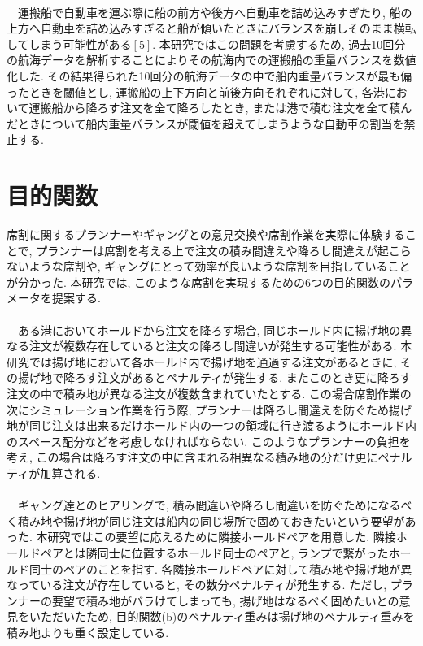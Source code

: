  \\
　運搬船で自動車を運ぶ際に船の前方や後方へ自動車を詰め込みすぎたり, 船の上方へ自動車を詰め込みすぎると船が傾いたときにバランスを崩しそのまま横転してしまう可能性がある$[5]$. 本研究ではこの問題を考慮するため, 過去10回分の航海データを解析することによりその航海内での運搬船の重量バランスを数値化した. その結果得られた10回分の航海データの中で船内重量バランスが最も偏ったときを閾値とし, 運搬船の上下方向と前後方向それぞれに対して, 各港において運搬船から降ろす注文を全て降ろしたとき, または港で積む注文を全て積んだときについて船内重量バランスが閾値を超えてしまうような自動車の割当を禁止する.

\section{目的関数}
席割に関するプランナーやギャングとの意見交換や席割作業を実際に体験することで, プランナーは席割を考える上で注文の積み間違えや降ろし間違えが起こらないような席割や, ギャングにとって効率が良いような席割を目指していることが分かった. 本研究では, このような席割を実現するための6つの目的関数のパラメータを提案する. \\

 \\
　ある港においてホールドから注文を降ろす場合, 同じホールド内に揚げ地の異なる注文が複数存在していると注文の降ろし間違いが発生する可能性がある. 本研究では揚げ地において各ホールド内で揚げ地を通過する注文があるときに, その揚げ地で降ろす注文があるとペナルティが発生する.  またこのとき更に降ろす注文の中で積み地が異なる注文が複数含まれていたとする. この場合席割作業の次にシミュレーション作業を行う際, プランナーは降ろし間違えを防ぐため揚げ地が同じ注文は出来るだけホールド内の一つの領域に行き渡るようにホールド内のスペース配分などを考慮しなければならない. このようなプランナーの負担を考え, この場合は降ろす注文の中に含まれる相異なる積み地の分だけ更にペナルティが加算される. \\


 \\
　ギャング達とのヒアリングで, 積み間違いや降ろし間違いを防ぐためになるべく積み地や揚げ地が同じ注文は船内の同じ場所で固めておきたいという要望があった. 本研究ではこの要望に応えるために隣接ホールドペアを用意した. 隣接ホールドペアとは隣同士に位置するホールド同士のペアと, ランプで繋がったホールド同士のペアのことを指す. 各隣接ホールドペアに対して積み地や揚げ地が異なっている注文が存在していると, その数分ペナルティが発生する. ただし, プランナーの要望で積み地がバラけてしまっても, 揚げ地はなるべく固めたいとの意見をいただいたため, 目的関数(b)のペナルティ重みは揚げ地のペナルティ重みを積み地よりも重く設定している. \\

